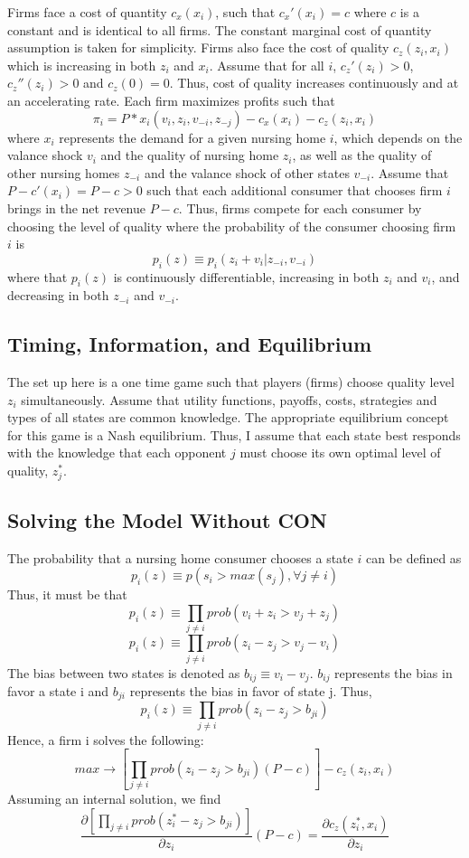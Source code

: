 \documentclass[../Main.tex]{subfiles}
\begin{document}
Firms face a cost of quantity $c_x(x_i)$, such that $c_x'(x_i)=c$ where $c$ is a constant and is identical to all firms. The constant marginal cost of quantity assumption is taken for simplicity. Firms also face the cost of quality $c_z(z_i,x_i) $ which is increasing in both $z_i$ and $x_i$. Assume that for all $i$, $c_z'(z_i)>0$, $c_z''(z_i)>0$ and $c_z(0)=0$. Thus, cost of quality increases continuously and at an accelerating rate. Each firm maximizes profits such that $$\pi_i = P*x_i(v_i, z_i, v_{-i}, z_{-j}) -c_x(x_i) -c_z(z_i,x_i) $$ 
where $x_i$ represents the demand for a given nursing home $i$, which depends on the valance shock $v_i$ and the quality of nursing home $z_i$, as well as the quality of other nursing homes $z_{-i}$ and the valance shock of other states $v_{-i}$. 
Assume that $P - c'(x_i)= P - c > 0$ such that each additional consumer that chooses firm $i$ brings in the net revenue $P - c$. Thus, firms compete for each consumer by choosing the level of quality where the probability of the consumer choosing firm $i$ is $$ p_{i}(z) \equiv p_i(z_i + v_i |z_{-i}, v_{-i}) $$
where that $p_{i}(z)$ is continuously differentiable, increasing in both $z_i$ and $v_i$, and decreasing in both $z_{-i}$ and $v_{-i}$.

\subsection{Timing, Information, and Equilibrium}
The set up here is a one time game such that players (firms) choose quality level $z_i$ simultaneously. Assume that utility functions, payoffs, costs, strategies and types of all states are common knowledge. The appropriate equilibrium concept for this game is a Nash equilibrium. Thus, I assume that each state best responds with the knowledge that each opponent $j$ must choose its own optimal level of quality, $z_j^*$.

\subsection{Solving the Model Without CON}
The probability that a nursing home consumer chooses a state $i$ can be defined as $$p_i(z) \equiv p(s_i> max(s_j), \forall j \neq i )$$
Thus, it must be that $$p_i(z) \equiv \prod_{j\neq i} prob(v_i + z_i > v_j + z_j) $$ 
 $$p_i(z) \equiv \prod_{j\neq i} prob(z_i-z_j > v_j - v_i) $$ 
The bias between two states is denoted as $b_{ij} \equiv v_i -v_j $. $b_{ij}$ represents the bias in favor a state i and $b_{ji}$ represents the bias in favor of state j. Thus,$$p_i(z) \equiv \prod_{j\neq i} prob(z_i -z_j > b_{ji}) $$  
Hence, a firm i solves the following:$$max \rightarrow [\prod_{j\neq i} prob(z_i -z_j > b_{ji})(P-c)] - c_z(z_i,x_i)$$
Assuming an internal solution, we find 
 $$\frac{\partial [\prod_{j\neq i} prob(z_i^* -z_j > b_{ji})]}{\partial z_i}(P-c) = \frac{\partial c_z(z_i^*,x_i)}{\partial z_i}$$
\end{document}
